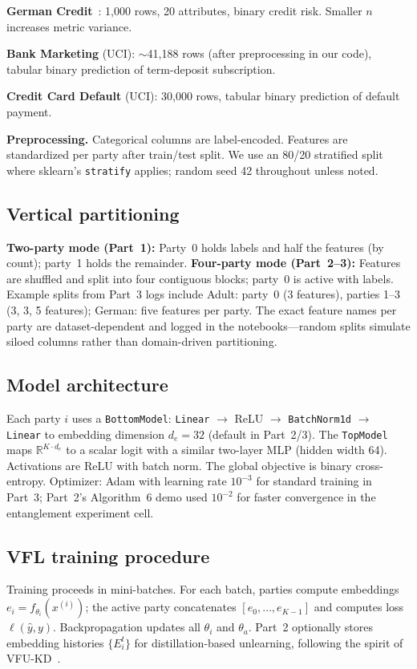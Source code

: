 \documentclass[sigconf,nonacm]{acmart}
\begin{document}
\textbf{German Credit}~\cite{hofmann1994german}: 1{,}000 rows, 20 attributes, binary credit risk. Smaller $n$ increases metric variance.

\textbf{Bank Marketing} (UCI): $\sim$41{,}188 rows (after preprocessing in our code), tabular binary prediction of term-deposit subscription. 

\textbf{Credit Card Default} (UCI): 30{,}000 rows, tabular binary prediction of default payment.

\textbf{Preprocessing.} Categorical columns are label-encoded. Features are standardized per party after train/test split. We use an 80/20 stratified split where sklearn's \texttt{stratify} applies; random seed 42 throughout unless noted.

\subsection{Vertical partitioning}
\textbf{Two-party mode (Part~1):} Party~0 holds labels and half the features (by count); party~1 holds the remainder. \textbf{Four-party mode (Part~2--3):} Features are shuffled and split into four contiguous blocks; party~0 is active with labels. Example splits from Part~3 logs include Adult: party~0 (3 features), parties 1--3 (3, 3, 5 features); German: five features per party. The exact feature names per party are dataset-dependent and logged in the notebooks---random splits simulate siloed columns rather than domain-driven partitioning.

\subsection{Model architecture}
Each party $i$ uses a \texttt{BottomModel}: \texttt{Linear} $\to$ ReLU $\to$ \texttt{BatchNorm1d} $\to$ \texttt{Linear} to embedding dimension $d_e{=}32$ (default in Part~2/3). The \texttt{TopModel} maps $\mathbb{R}^{K\cdot d_e}$ to a scalar logit with a similar two-layer MLP (hidden width 64). Activations are ReLU with batch norm. The global objective is binary cross-entropy. Optimizer: Adam with learning rate $10^{-3}$ for standard training in Part~3; Part~2's Algorithm~6 demo used $10^{-2}$ for faster convergence in the entanglement experiment cell.

\subsection{VFL training procedure}
Training proceeds in mini-batches. For each batch, parties compute embeddings $e_i = f_{\theta_i}(x^{(i)})$; the active party concatenates $[e_0,\ldots,e_{K-1}]$ and computes loss $\ell(\hat{y}, y)$. Backpropagation updates all $\theta_i$ and $\theta_a$. Part~2 optionally stores embedding histories $\{E_i^t\}$ for distillation-based unlearning, following the spirit of VFU-KD~\cite{varshney2025vfu}.
\end{document}
